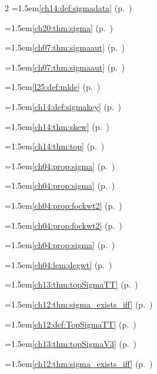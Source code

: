 \begin{multicols}{2}
\hangindent=1.5em\quad \ref{ch14:def:sigmadata} (p.~\pageref{ch14:def:sigmadata})\par
\hangindent=1.5em\quad \ref{ch20:thm:sigma} (p.~\pageref{ch20:thm:sigma})\par
\hangindent=1.5em\quad \ref{ch07:thm:sigmaaut} (p.~\pageref{ch07:thm:sigmaaut})\par
\hangindent=1.5em\quad \ref{ch07:thm:sigmaaut} (p.~\pageref{ch07:thm:sigmaaut})\par
\hangindent=1.5em\quad \ref{l25:def:mlde} (p.~\pageref{l25:def:mlde})\par
\hangindent=1.5em\quad \ref{ch14:def:sigmakey} (p.~\pageref{ch14:def:sigmakey})\par
\hangindent=1.5em\quad \ref{ch14:thm:skew} (p.~\pageref{ch14:thm:skew})\par
\hangindent=1.5em\quad \ref{ch14:thm:top} (p.~\pageref{ch14:thm:top})\par
\hangindent=1.5em\quad \ref{ch04:prop:sigma} (p.~\pageref{ch04:prop:sigma})\par
\hangindent=1.5em\quad \ref{ch04:prop:sigma} (p.~\pageref{ch04:prop:sigma})\par
\hangindent=1.5em\quad \ref{ch04:prop:fockwt2} (p.~\pageref{ch04:prop:fockwt2})\par
\hangindent=1.5em\quad \ref{ch04:prop:fockwt2} (p.~\pageref{ch04:prop:fockwt2})\par
\hangindent=1.5em\quad \ref{ch04:prop:sigma} (p.~\pageref{ch04:prop:sigma})\par
\hangindent=1.5em\quad \ref{ch04:lem:degwt} (p.~\pageref{ch04:lem:degwt})\par
\hangindent=1.5em\quad \ref{ch13:thm:topSigmaTT} (p.~\pageref{ch13:thm:topSigmaTT})\par
\hangindent=1.5em\quad \ref{ch12:thm:sigma_exists_iff} (p.~\pageref{ch12:thm:sigma_exists_iff})\par
\hangindent=1.5em\quad \ref{ch12:def:TopSigmaTT} (p.~\pageref{ch12:def:TopSigmaTT})\par
\hangindent=1.5em\quad \ref{ch13:thm:topSigmaV3} (p.~\pageref{ch13:thm:topSigmaV3})\par
\hangindent=1.5em\quad \ref{ch12:thm:sigma_exists_iff} (p.~\pageref{ch12:thm:sigma_exists_iff})\par

\end{multicols}
